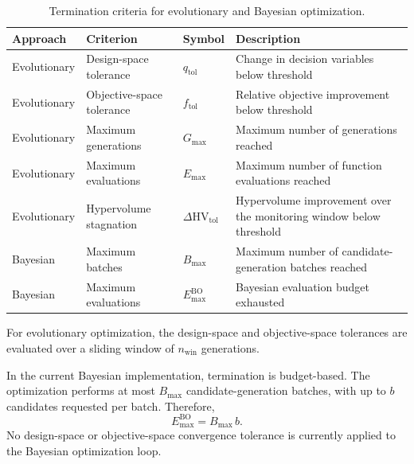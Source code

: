 \begin{table}[htbp]
\centering
\caption{Termination criteria for evolutionary and Bayesian optimization.}
\label{tab:termination_sc}
\begin{tabularx}{\textwidth}{@{}l l l >{\raggedright\arraybackslash}X@{}}
\toprule
\textbf{Approach} & \textbf{Criterion} & \textbf{Symbol} & \textbf{Description} \\
\midrule
Evolutionary & Design-space tolerance & $q_{\text{tol}}$ & Change in decision variables below
threshold \\

Evolutionary & Objective-space tolerance & $f_{\text{tol}}$ & Relative objective improvement below
threshold \\

Evolutionary & Maximum generations & $G_{\max}$ & Maximum number of generations reached \\

Evolutionary & Maximum evaluations & $E_{\max}$ & Maximum number of function evaluations reached \\

Evolutionary & Hypervolume stagnation & $\Delta\mathrm{HV}_{\text{tol}}$ & Hypervolume improvement
over the monitoring window below threshold \\

Bayesian & Maximum batches & $B_{\max}$ & Maximum number of candidate-generation batches reached \\

Bayesian & Maximum evaluations & $E_{\max}^{\mathrm{BO}}$ & Bayesian evaluation budget exhausted \\
\bottomrule
\end{tabularx}
\end{table}

For evolutionary optimization, the design-space and objective-space tolerances are evaluated over a
sliding window of $n_{\mathrm{win}}$ generations.

In the current Bayesian implementation, termination is budget-based. The optimization performs at
most $B_{\max}$ candidate-generation batches, with up to $b$ candidates requested per batch.
Therefore,
\begin{equation}
    E_{\max}^{\mathrm{BO}} = B_{\max}\,b .
\end{equation}
No design-space or objective-space convergence tolerance is currently applied to the Bayesian
optimization loop.

